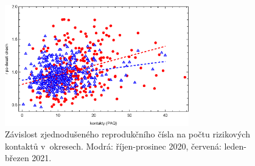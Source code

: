 \begin{enumerate}
\begin{figure}
\begin{center}
\includegraphics[width=8cm]{pic/sbornikRegrese010.eps}
\caption{Závislost zjednodušeného reprodukčního čísla na počtu rizikových kontaktů v~okresech. Modrá: říjen-prosinec 2020, červená: leden-březen 2021.}
\label{fig:okresy}
\end{center}
\end{figure}


\end{enumerate}
